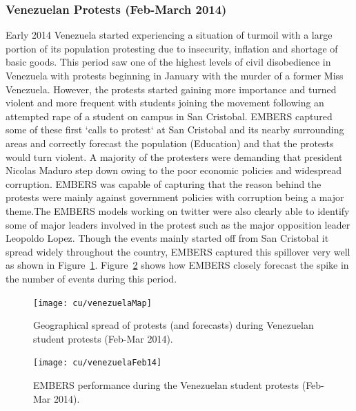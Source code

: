 \subsubsection*{Venezuelan Protests (Feb-March 2014)}
Early 2014 Venezuela started experiencing a situation of turmoil with a
large portion of its population protesting due to insecurity, inflation
and shortage of basic goods. This period saw one of the highest levels of
civil disobedience in Venezuela with protests beginning in January with the murder
of a former Miss Venezuela. However, the protests started gaining more importance
 and turned violent and more frequent with students joining the movement following an
attempted rape of a student on campus in San Cristobal. EMBERS captured
some of these first `calls to protest` at San Cristobal and its nearby surrounding areas
 and correctly forecast the population (Education) and that the protests would turn violent.
A majority of the protesters were demanding that president Nicolas Maduro step down owing
to the poor economic policies and widespread corruption. EMBERS was capable of capturing
that the reason behind the protests were mainly against government policies with corruption being
a major theme.The EMBERS models working on twitter were also clearly able to identify some of major
leaders involved in the protest such as the major opposition leader Leopoldo Lopez.
Though the events mainly started off from San Cristobal it spread widely throughout the country, EMBERS
captured this spillover very well as shown in Figure~\ref{fig:venezuelaMap}.
Figure~\ref{fig:venezuelaMarch14}
shows how EMBERS closely forecast the spike in the number of events  during this period.

\begin{figure} %
\centering
\texttt{[image: cu/venezuelaMap]}
\caption{Geographical spread of protests (and forecasts) during
Venezuelan student protests (Feb-Mar 2014).}
\label{fig:venezuelaMap}
\end{figure}

\begin{figure} %
\centering
\texttt{[image: cu/venezuelaFeb14]}
\caption{EMBERS performance during the Venezuelan student protests (Feb-Mar 2014).}
\label{fig:venezuelaMarch14}
\end{figure}

